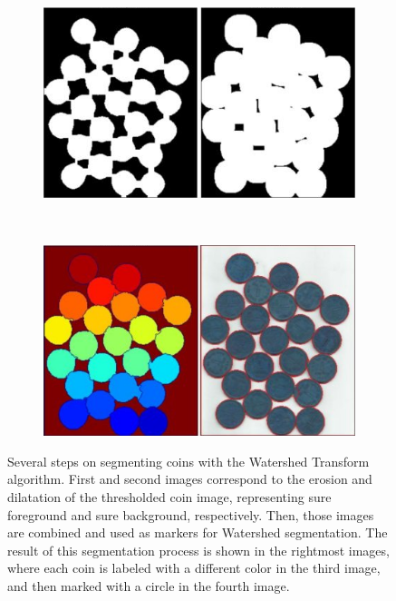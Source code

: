 
\begin{figure}[htbp]
	\centering
    \begin{subfigure}[l]{0.49\textwidth}
	    \centering
    	\includegraphics[width=\textwidth]
    	{figures/Watershed-example-02.png}
	\end{subfigure}
	~
    \begin{subfigure}[r]{0.49\textwidth}
	    \centering
    	\includegraphics[width=\textwidth]
    	{figures/Watershed-example-03.png}
	\end{subfigure} 
    \caption[dummy]{Several steps on segmenting coins with the Watershed Transform algorithm\footnotemark. First and second images correspond to the erosion and dilatation of the thresholded coin image, representing sure foreground and sure background, respectively. Then, those images are combined and used as markers for Watershed segmentation. The result of this segmentation process is shown in the rightmost images, where each coin is labeled with a different color in the third image, and then marked with a circle in the fourth image. }
    \label{fig:watershed_example}
\end{figure}


